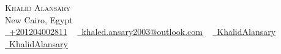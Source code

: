 \documentclass[letterpaper,11pt]{article}
\begin{document}
\begin{center}
    {\Huge \scshape Khalid Alansary} \\ \vspace{1pt}
    New Cairo, Egypt \\ \vspace{1pt}
    \small \href{tel:+201204002811}{\raisebox{-0.1\height}\faPhone\ \underline{+201204002811}} ~ \href{mailto:khaled.ansary2003@outlook.com}{\raisebox{-0.2\height}\faEnvelope\  \underline{khaled.ansary2003@outlook.com}} ~ 
    \href{https://www.linkedin.com/in/khalidalansary/}{\raisebox{-0.2\height}\faLinkedin\ \underline{KhalidAlansary}}  ~
    \href{https://github.com/khalidAlansary/}{\raisebox{-0.2\height}\faGithub\ \underline{KhalidAlansary}}
    \vspace{-8pt}
\end{center}


\end{document}
